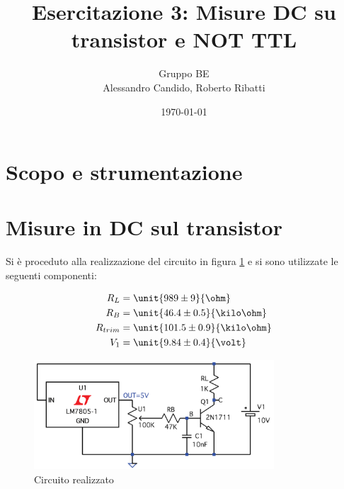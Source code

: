 \documentclass[10pt,a4paper]{article}
\title{Esercitazione 3: Misure DC su transistor e NOT TTL}
\author{Gruppo BE \\ Alessandro Candido, Roberto Ribatti}
\date{\today}
\begin{document}
\maketitle

\section{Scopo e strumentazione}

\section{Misure in DC sul transistor}
Si è proceduto alla realizzazione del circuito in figura \figurename{\ref{circuito}} e si sono utilizzate le seguenti componenti:
\begin{figure}[h!]
\begin{minipage}[c]{0.5\textwidth}
\begin{align*}
R_L &= \unit{989 \pm 9}{\ohm}\\
R_B &= \unit{46.4 \pm 0.5}{\kilo\ohm}\\
R_{trim} &= \unit{101.5 \pm 0.9}{\kilo \ohm}\\
V_1 &= \unit{9.84 \pm 0.4}{\volt}\\
\end{align*}
	\end{minipage}
	\begin{minipage}[c]{0.5\textwidth}
	\centering
	\includegraphics[width=0.8\textwidth]{../grafici/circuito.png}
	\caption{Circuito realizzato}
	\label{circuito}
	\end{minipage}
\end{figure}
\end{document}
